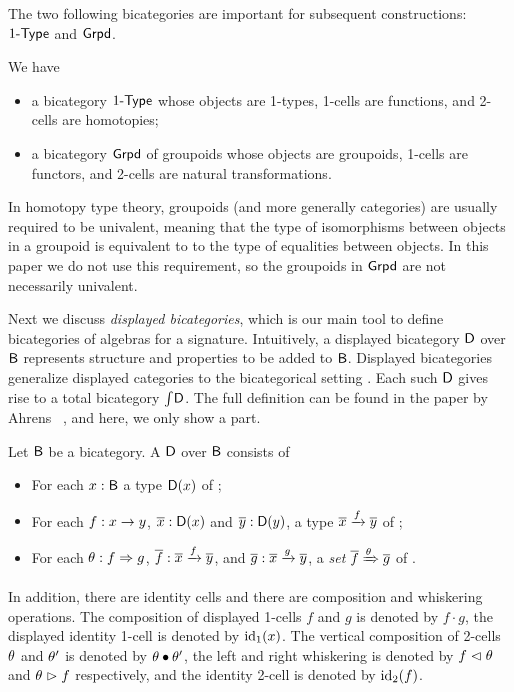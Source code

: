 The two following bicategories are important for subsequent constructions:
$1\mbox{-}\mathsf{Type}$ and $\mathsf{Grpd}$.

\begin{example}
We have
\begin{itemize}
	\item a bicategory $1\mbox{-}\mathsf{Type}$ whose objects are 1-types, 1-cells are functions, and 2-cells are homotopies;
	\item a bicategory $\mathsf{Grpd}$ of groupoids
	whose objects are groupoids, 1-cells are functors, and 2-cells are natural transformations.
\end{itemize}
\end{example}
In homotopy type theory, groupoids (and more generally categories) are
usually required to be univalent, meaning that the type of isomorphisms between objects
in a groupoid is equivalent to to the type of equalities between objects. In this paper we
do not use this requirement, so the groupoids in $\mathsf{Grpd}$ are not
necessarily univalent.


Next we discuss \emph{displayed bicategories}, which is our main tool to define bicategories of algebras for a signature.
Intuitively, a displayed bicategory $\mathsf{D}$ over $\mathsf{B}$ represents structure and properties to be added to $\mathsf{B}$.
Displayed bicategories generalize displayed categories to the bicategorical setting \cite{AhrensL19}.
Each such $\mathsf{D}$ gives rise to a total bicategory $\textstyle \int_{}{\mathsf{D}}$.
The full definition can be found in the paper by Ahrens \etal \ \cite{bicatjournal}, and here, we only show a part.

\begin{definition}
Let $\mathsf{B}$ be a bicategory.
A  $\mathsf{D}$ over $\mathsf{B}$ consists of
\begin{itemize}
	\item For each $x : \mathsf{B}$ a type ${\mathsf{D}}(x)$ of ;
	\item For each $f : x \rightarrow y$, $\overline{x} : {\mathsf{D}}(x)$ and $\overline{y} : {\mathsf{D}}(y)$,
	a type $\overline{x} \xrightarrow{f} \overline{y}$ of ;
	\item For each $\theta : f \Rightarrow g$, $\overline{f} : \overline{x} \xrightarrow{f} \overline{y}$, and $\overline{g} : \overline{x} \xrightarrow{g} \overline{y}$, a \emph{set} $\overline{f} \xRightarrow{\theta} \overline{g}$ of .
\end{itemize}
In addition, there are identity cells and there are composition and whiskering operations.
The composition of displayed 1-cells $f$ and $g$ is denoted by $f \cdot g$, the displayed identity 1-cell is denoted by $\operatorname{id}_1(x)$.
The vertical composition of 2-cells $\theta$ and $\theta'$ is denoted by $\theta \bullet \theta'$, the left and right whiskering is denoted by $f \vartriangleleft \theta$ and $\theta \vartriangleright f$ respectively,
and the identity 2-cell is denoted by $\operatorname{id}_2(f)$. 
\end{definition}


